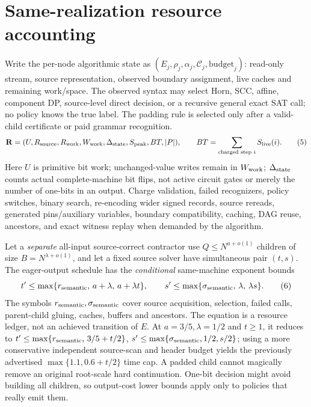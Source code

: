 \documentclass[11pt]{article}
\begin{document}
\section{Same-realization resource accounting}
Write the per-node algorithmic state as
$(E_j,\rho_j,\alpha_j,\mathcal C_j,\mathrm{budget}_j)$:
read-only stream, source representation, observed
boundary assignment, live caches and remaining work/space.
The observed syntax may select Horn, SCC, affine,
component DP, source-level direct decision, or a recursive
general exact SAT call; no policy knows the true label.
The padding rule is selected only after a valid-child
certificate or paid grammar recognition.
\[
 \mathbf R=(U,R_{\rm source},R_{\rm work},W_{\rm work},
 \Delta_{\rm state},S_{\rm peak},BT,|P|),\qquad
 BT=\sum_{\text{charged step }i}S_{\rm live}(i).
 \tag{5}
\]
Here $U$ is primitive bit work; unchanged-value writes
remain in $W_{\rm work}$; $\Delta_{\rm state}$ counts
actual complete-machine bit flips, not active circuit
gates or merely the number of one-bits in an output.
Charge validation, failed recognizers, policy switches,
binary search, re-encoding wider signed records,
source rereads, generated pins/auxiliary variables,
boundary compatibility, caching, DAG reuse, ancestors,
and exact witness replay when demanded by the algorithm.

Let a \emph{separate} all-input source-correct contractor
use $Q\le N^{a+o(1)}$ children of size
$B=N^{\lambda+o(1)}$, and let a fixed source solver
have simultaneous pair $(t,s)$.
The eager-output schedule has the \emph{conditional}
same-machine exponent bounds
\[
 t'\le\max\{r_{\rm semantic},\,a+\lambda,\,
                  a+\lambda t\},\qquad
 s'\le\max\{\sigma_{\rm semantic},\,\lambda,\,
                  \lambda s\}. \tag{6}
\]
The symbols $r_{\rm semantic},\sigma_{\rm semantic}$
cover source acquisition, selection, failed calls,
parent-child gluing, caches, buffers and ancestors.
The equation is a resource ledger, not an achieved
transition of $E$.
At $a=3/5,\lambda=1/2$ and $t\ge1$, it reduces to
$t'\le\max\{r_{\rm semantic},\,3/5+t/2\}$,
$s'\le\max\{\sigma_{\rm semantic},1/2,s/2\}$;
using a more conservative independent source-scan
and header budget yields the previously advertised
$\max\{1.1,0.6+t/2\}$ time cap. A padded child
cannot magically remove an original root-scale
hard continuation. One-bit decision might avoid
building all children, so output-cost lower bounds
apply only to policies that really emit them.
\end{document}

